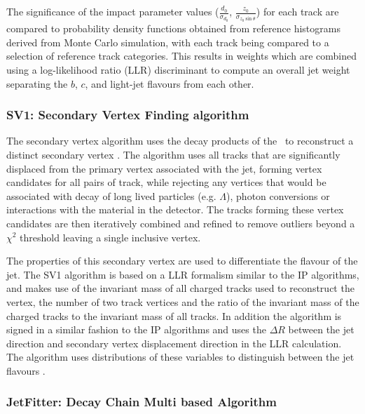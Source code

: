 		The significance of the impact parameter values ($\frac{d_0}{\sigma_{d_0}}$, $\frac{z_0}{\sigma_{z_0\sin\theta}}$) for each track are compared to probability density functions obtained from reference histograms derived from Monte Carlo simulation, with each track being compared to a selection of reference track categories. This results in weights which are combined using a log-likelihood ratio (LLR) discriminant to compute an overall jet weight separating the $b$, $c$, and light-jet flavours from each other. \cite{btagOptimisation, bTagPerformance}

	\subsubsection{SV1: Secondary Vertex Finding algorithm}
	\label{det:btag:sv}

		The secondary vertex algorithm uses the decay products of the \bhadron\ to reconstruct a distinct secondary vertex \cite{IP3D}. The algorithm uses all tracks that are significantly displaced from the primary vertex associated with the jet, forming vertex candidates for all pairs of track, while rejecting any vertices that would be associated with decay of long lived particles (e.g. $\Lambda$), photon conversions or interactions with the material in the detector. The tracks forming these vertex candidates are then iteratively combined and refined to remove outliers beyond a $\chi^2$ threshold leaving a single inclusive vertex.

		The properties of this secondary vertex are used to differentiate the flavour of the jet. The SV1 algorithm is based on a LLR formalism similar to the IP algorithms, and makes use of the invariant mass of all charged tracks used to reconstruct the vertex, the number of two track vertices and the ratio of the invariant mass of the charged tracks to the invariant mass of all tracks. In addition the algorithm is signed in a similar fashion to the IP algorithms and uses the $\Delta R$ between the jet direction and secondary vertex displacement direction in the LLR calculation. The algorithm uses distributions of these variables to distinguish between the jet flavours \cite{btagOptimisation, bTagPerformance}.

	\subsubsection{JetFitter: Decay Chain Multi based Algorithm}
	\label{det:btag:jf}

